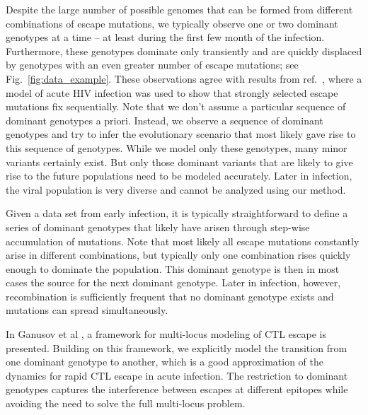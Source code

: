 \documentclass{frontiers}
\newcommand{\FIG}[1]{Fig.~\ref{fig:#1}}
\begin{document}
Despite the large number of possible genomes that can be formed from
different combinations of escape mutations, we typically observe one or
two dominant genotypes at a time -- at least during the first few month
of the infection. Furthermore, these genotypes dominate only transiently
and are quickly displaced by genotypes with an even greater number of
escape mutations; see \FIG{data_example}. 
These observations agree with results from
ref.~\citep{silva_dynamics_2012}, where a model of acute HIV infection
was used to show that strongly selected escape mutations fix sequentially. 
Note that we don't assume a
particular sequence of dominant genotypes a priori. Instead, we observe a
sequence of dominant genotypes and try to infer the evolutionary
scenario that most likely gave rise to this sequence of genotypes. While
we model only these genotypes, many minor variants certainly exist. But
only those dominant variants that are likely to give rise to the future
populations need to be modeled accurately. Later in infection, the viral
population is very diverse and cannot be analyzed using our method.

Given a data set from early infection, it is typically straightforward to
define a series of dominant genotypes that likely have arisen through
step-wise accumulation of mutations. Note that most likely all escape mutations constantly
arise in different combinations, but typically only one combination
rises quickly enough to dominate the population. This dominant genotype
is then in most cases the source for the next dominant genotype. Later
in infection, however, recombination is sufficiently frequent that no
dominant genotype exists and mutations can spread simultaneously.

In Ganusov et al \cite{ganusov_mathematical_2013}, a framework for
multi-locus modeling of CTL escape is presented. Building on this
framework, we explicitly model the transition from one dominant genotype
to another, which is a good approximation of the dynamics for rapid CTL
escape in acute infection. The restriction to dominant genotypes
captures the interference between escapes at different epitopes while
avoiding the need to solve the full multi-locus problem.
\end{document}
